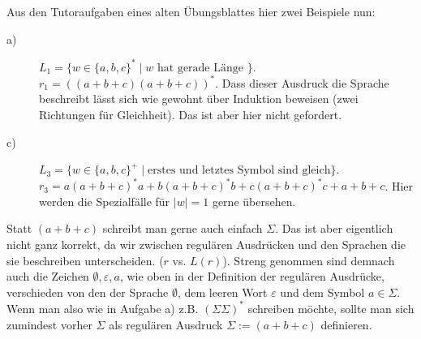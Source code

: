 \documentclass[11pt, a4paper]{article}
\begin{document}
Aus den Tutoraufgaben eines alten Übungsblattes hier zwei Beispiele nun:
\begin{description}
	\item[a)] \( L_1 = \{ w \in \{ a, b, c \}^\ast \mid w \text{ hat gerade Länge } \} \).\\
		\( r_1 = ((a+b+c)(a+b+c))^\ast \). Dass dieser Ausdruck die Sprache beschreibt lässt sich wie gewohnt über Induktion beweisen (zwei Richtungen für Gleichheit). Das ist aber hier nicht gefordert.
	\item[c)] \( L_3 = \{ w \in \{ a, b, c \}^+ \mid \text{erstes und letztes Symbol sind gleich} \} \).\\
		\( r_3 = a(a+b+c)^\ast a + b(a+b+c)^\ast b + c(a+b+c)^\ast c + a + b + c \). Hier werden die Spezialfälle für \( \left| w \right| = 1 \) gerne übersehen.
\end{description}
Statt \( (a+b+c) \) schreibt man gerne auch einfach \( \Sigma \). Das ist aber eigentlich nicht ganz korrekt, da wir zwischen regulären Ausdrücken und den Sprachen die sie beschreiben unterscheiden. (\( r \) vs. \( L(r) \)). Streng genommen sind demnach auch die Zeichen \( \emptyset, \varepsilon, a \), wie oben in der Definition der regulären Ausdrücke, verschieden von den der Sprache \( \emptyset \), dem leeren Wort \( \varepsilon \) und dem Symbol \( a \in \Sigma \). Wenn man also wie in Aufgabe a) z.B. \( (\Sigma\Sigma)^\ast \) schreiben möchte, sollte man sich zumindest vorher \( \Sigma \) als regulären Ausdruck \( \Sigma := (a+b+c) \) definieren.
\end{document}
